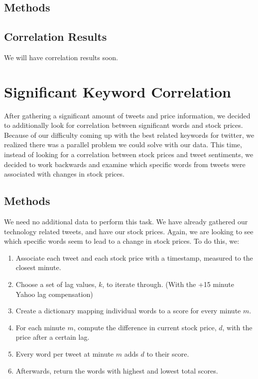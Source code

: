 \documentclass[preprint,pre,floats,aps,amsmath,amssymb,12pt]{revtex4}
\begin{document}
\subsection{Methods}

\subsection{Correlation Results}
We will have correlation results soon.



\section{Significant Keyword Correlation}
\label{sec:keyword}
After gathering a significant amount of tweets and price information, we decided to additionally look for correlation between significant words and stock prices. Because of our difficulty coming up with the best related keywords for twitter, we realized there was a parallel problem we could solve with our data. This time, instead of looking for a correlation between stock prices and tweet sentiments, we decided to work backwards and examine which specific words from tweets were associated with changes in stock prices. 

\subsection{Methods}
We need no additional data to perform this task. We have already gathered our technology related tweets, and have our stock prices. Again, we are looking to see which specific words seem to lead to a change in stock prices. To do this, we:
\begin{enumerate}
\item Associate each tweet and each stock price with a timestamp, measured to the closest minute.
\item Choose a set of lag values, $k$, to iterate through. (With the +15 minute Yahoo lag compensation)
\item Create a dictionary mapping individual words to a score for every minute $m$. 
\item For each minute $m$, compute the difference in current stock price, $d$, with the price after a certain lag. 
\item Every word per tweet at minute $m$ adds $d$ to their score. 
\item Afterwards, return the words with highest and lowest total scores.
\end{enumerate}
\end{document}
